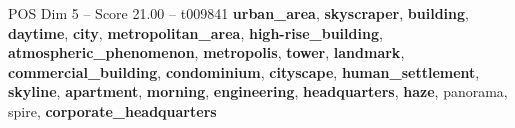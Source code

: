\begin{textsample}{POS Dim 5 – Score 21.00 – t009841}  \label{ex:f5_pos_011}
\textbf{urban\_area}, \textbf{skyscraper}, \textbf{building}, \textbf{daytime}, \textbf{city}, \textbf{metropolitan\_area}, \textbf{high-rise\_building}, \textbf{atmospheric\_phenomenon}, \textbf{metropolis}, \textbf{tower}, \textbf{landmark}, \textbf{commercial\_building}, \textbf{condominium}, \textbf{cityscape}, \textbf{human\_settlement}, \textbf{skyline}, \textbf{apartment}, \textbf{morning}, \textbf{engineering}, \textbf{headquarters}, \textbf{haze}, panorama, spire, \textbf{corporate\_headquarters}

\end{textsample}
